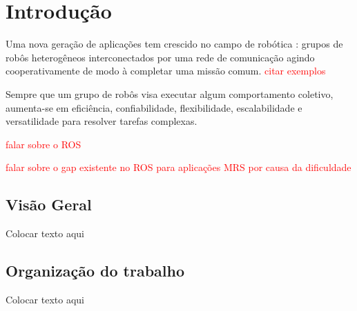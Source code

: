 \chapter[Introdução]{Introdução}

    Uma nova geração de aplicações tem crescido no campo de robótica \cite{ref:mohamed2008middleware}: grupos de robôs heterogêneos interconectados por uma rede de comunicação agindo cooperativamente de modo à completar uma missão comum. \textcolor{red}{citar exemplos}
    
    Sempre que um grupo de robôs visa executar algum comportamento coletivo, aumenta-se em eficiência, confiabilidade, flexibilidade, escalabilidade e versatilidade para resolver tarefas complexas.
    
    \textcolor{red}{falar sobre o ROS}
    
    \textcolor{red}{falar sobre o gap existente no ROS para aplicações MRS por causa da dificuldade}

    \section{Visão Geral}
        Colocar texto aqui
    
    \section{Organização do trabalho}
        Colocar texto aqui
